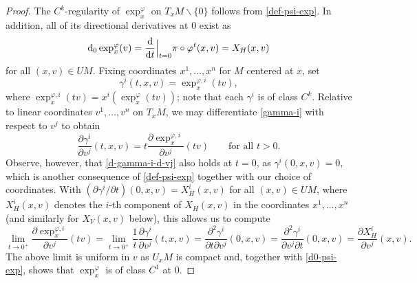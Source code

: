 \documentclass[pdftex]{sigma}
\numberwithin{equation}{section}
\theoremstyle{definition}
\begin{document}
\begin{proof}
 The $C^k$-regularity of $\exp^{\varphi}_x$ on $T_xM \smallsetminus \{0\}$ follows from \eqref{def-psi-exp}. In addition, all of its directional derivatives at $0$ exist as
 \begin{equation}\label{d0-psi-exp} {\rm d}_0\exp_x^{\varphi}(v) = \frac{\rm d}{{\rm d}t} \Big|_{t=0} \pi \circ \varphi^t(x,v) = X_H(x,v)\end{equation}for all $(x,v)\in UM$. Fixing coordinates $x^1, \ldots, x^n$ for $M$ centered at $x$, set
 \begin{equation}\label{gamma-i}
 \gamma^i(t,x,v) = \exp_x^{\varphi, i}(tv),
 \end{equation}where $\exp_x^{\varphi, i}(tv) = x^i(\exp_x^{\varphi}(tv))$; note that each $\gamma^i$ is of class $C^k$. Relative to linear coordinates $v^1,\ldots, v^n$ on $T_xM$, we may differentiate \eqref{gamma-i} with respect to $v^j$ to obtain
 \begin{equation}\label{d-gamma-i-d-vj}
 \frac{\partial \gamma^i}{\partial v^j}(t,x,v) =t \frac{\partial \exp_x^{\varphi,i}}{\partial v^j}(tv) \qquad\mbox{for all }t>0.
 \end{equation}Observe, however, that \eqref{d-gamma-i-d-vj} also holds at $t=0$, as $\gamma^i(0,x,v) = 0$, which is another consequence of \eqref{def-psi-exp} together with our choice of coordinates. With $(\partial \gamma^i/\partial t)(0,x,v) = X_H^i(x,v)$ for all $(x,v)\in UM$, where $X_H^i(x,v)$ denotes the $i$-th component of $X_H(x,v)$ in the coordinates $x^1,\ldots, x^n$ (and similarly for $X_V(x,v)$ below), this allows us to compute
 \begin{equation*}
\lim_{t\to 0^+} \frac{\partial \exp_x^{\varphi, i}}{\partial v^j}(tv) = \lim_{t\to 0^+} \frac{1}{t} \frac{\partial \gamma^i}{\partial v^j}(t,x,v) = \frac{\partial^2 \gamma^i}{\partial t \partial v^j}(0,x,v) = \frac{\partial^2 \gamma^i}{\partial v^j \partial t}(0,x,v) = \frac{\partial X_H^i}{\partial v^j}(x,v).
 \end{equation*}
The above limit is uniform in $v$ as $U_xM$ is compact and, together with \eqref{d0-psi-exp}, shows that $\exp_x^{\varphi}$ is of class $C^1$ at $0$.


\end{proof}
\end{document}
